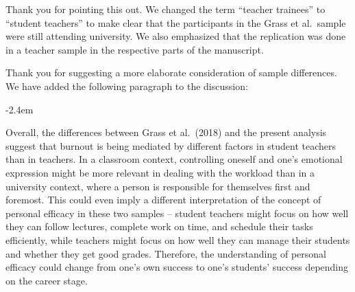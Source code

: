 \documentclass[draft]{article}
\renewenvironment{quote}{\begin{fquote}\advance\leftmargini -2.4em\begin{oldquote}}{\end{oldquote}\end{fquote}}
\newenvironment{fquote}
  {\def\FrameCommand{
	\fboxsep=0.6em %
	\fcolorbox{black}{white}}%
    \MakeFramed {\advance\hsize-2\width \FrameRestore}
    \begin{minipage}{\linewidth}
  }
  {\end{minipage}\endMakeFramed}
\begin{document}
Thank you for pointing this out.
We changed the term ``teacher trainees'' to ``student teachers'' to make clear that the participants in the Grass et al.~sample were still attending university.
We also emphasized that the replication was done in a teacher sample in the respective parts of the manuscript.

Thank you for suggesting a more elaborate consideration of sample differences.
We have added the following paragraph to the discussion:

\begin{quote}
Overall, the differences between Grass et al.~(2018) and the present analysis suggest that burnout is being mediated by different factors in student teachers than in teachers. In a classroom context, controlling oneself and one's emotional expression might be more relevant in dealing with the workload than in a university context, where a person is responsible for themselves first and foremost. This could even imply a different interpretation of the concept of personal efficacy in these two samples -- student teachers might focus on how well they can follow lectures, complete work on time, and schedule their tasks efficiently, while teachers might focus on how well they can manage their students and whether they get good grades. Therefore, the understanding of personal efficacy could change from one's own success to one's students' success depending on the career stage.
\end{quote}
\end{document}
